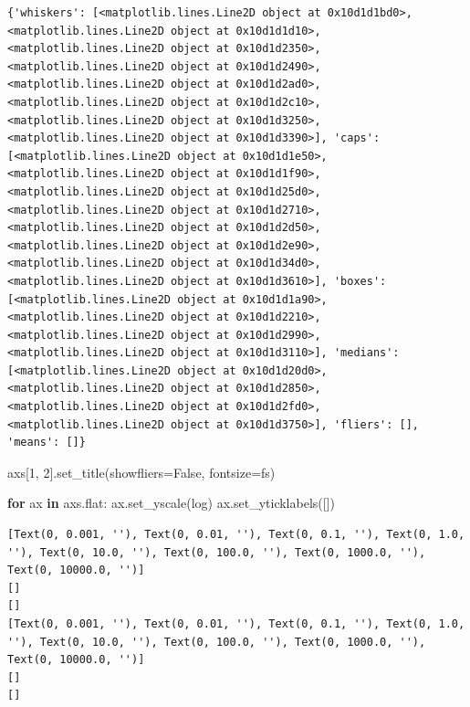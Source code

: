 \documentclass[
  letterpaper,
  DIV=11,
  numbers=noendperiod]{scrreprt}
\newenvironment{Shaded}{\begin{snugshade}}{\end{snugshade}}
\newcommand{\ControlFlowTok}[1]{\textcolor[rgb]{0.00,0.23,0.31}{\textbf{#1}}}
\newcommand{\DecValTok}[1]{\textcolor[rgb]{0.68,0.00,0.00}{#1}}
\newcommand{\KeywordTok}[1]{\textcolor[rgb]{0.00,0.23,0.31}{\textbf{#1}}}
\newcommand{\NormalTok}[1]{\textcolor[rgb]{0.00,0.23,0.31}{#1}}
\newcommand{\OperatorTok}[1]{\textcolor[rgb]{0.37,0.37,0.37}{#1}}
\newcommand{\StringTok}[1]{\textcolor[rgb]{0.13,0.47,0.30}{#1}}
\begin{document}
\begin{verbatim}
{'whiskers': [<matplotlib.lines.Line2D object at 0x10d1d1bd0>, <matplotlib.lines.Line2D object at 0x10d1d1d10>, <matplotlib.lines.Line2D object at 0x10d1d2350>, <matplotlib.lines.Line2D object at 0x10d1d2490>, <matplotlib.lines.Line2D object at 0x10d1d2ad0>, <matplotlib.lines.Line2D object at 0x10d1d2c10>, <matplotlib.lines.Line2D object at 0x10d1d3250>, <matplotlib.lines.Line2D object at 0x10d1d3390>], 'caps': [<matplotlib.lines.Line2D object at 0x10d1d1e50>, <matplotlib.lines.Line2D object at 0x10d1d1f90>, <matplotlib.lines.Line2D object at 0x10d1d25d0>, <matplotlib.lines.Line2D object at 0x10d1d2710>, <matplotlib.lines.Line2D object at 0x10d1d2d50>, <matplotlib.lines.Line2D object at 0x10d1d2e90>, <matplotlib.lines.Line2D object at 0x10d1d34d0>, <matplotlib.lines.Line2D object at 0x10d1d3610>], 'boxes': [<matplotlib.lines.Line2D object at 0x10d1d1a90>, <matplotlib.lines.Line2D object at 0x10d1d2210>, <matplotlib.lines.Line2D object at 0x10d1d2990>, <matplotlib.lines.Line2D object at 0x10d1d3110>], 'medians': [<matplotlib.lines.Line2D object at 0x10d1d20d0>, <matplotlib.lines.Line2D object at 0x10d1d2850>, <matplotlib.lines.Line2D object at 0x10d1d2fd0>, <matplotlib.lines.Line2D object at 0x10d1d3750>], 'fliers': [], 'means': []}
\end{verbatim}

\begin{Shaded}
\begin{Highlighting}[]
\NormalTok{axs[}\DecValTok{1}\NormalTok{, }\DecValTok{2}\NormalTok{].set\_title(}\StringTok{\textquotesingle{}showfliers=False\textquotesingle{}}\NormalTok{, fontsize}\OperatorTok{=}\NormalTok{fs)}

\ControlFlowTok{for}\NormalTok{ ax }\KeywordTok{in}\NormalTok{ axs.flat:}
\NormalTok{    ax.set\_yscale(}\StringTok{\textquotesingle{}log\textquotesingle{}}\NormalTok{)}
\NormalTok{    ax.set\_yticklabels([])}
\end{Highlighting}
\end{Shaded}

\begin{verbatim}
[Text(0, 0.001, ''), Text(0, 0.01, ''), Text(0, 0.1, ''), Text(0, 1.0, ''), Text(0, 10.0, ''), Text(0, 100.0, ''), Text(0, 1000.0, ''), Text(0, 10000.0, '')]
[]
[]
[Text(0, 0.001, ''), Text(0, 0.01, ''), Text(0, 0.1, ''), Text(0, 1.0, ''), Text(0, 10.0, ''), Text(0, 100.0, ''), Text(0, 1000.0, ''), Text(0, 10000.0, '')]
[]
[]
\end{verbatim}
\end{document}

